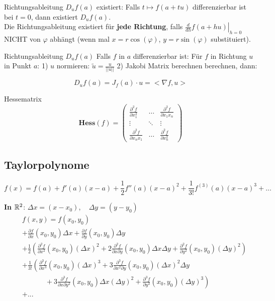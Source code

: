 \begin{Rezept}{Richtungsableitung $D_uf(a)$ existiert:}{} Falls $t \mapsto f(a + tu)$ differenzierbar ist bei $t=0$, dann existiert $D_uf(a)$.\\

	Die Richtungsableitung existiert für \textbf{jede Richtung}, falls $\left.\frac{d}{dh} f(a + hu) \right|_{h=0}$ NICHT von $\varphi$ abhängt (wenn mal $x=r\cos(\varphi)$, $y=r\sin(\varphi)$ substituiert).
\end{Rezept}

\begin{Rezept}{Richtungsableitung $D_u f(a)$}{}
Falls $f$ in $a$ differenzierbar ist: Für $f$ in Richtung $u$ in Punkt $a$: 1) $u$ normieren: $\tilde{u} = \frac{u}{||u||}$ 2) Jakobi Matrix berechnen berechnen, dann:

\[
    D_u f(a) = J_f(a) \cdot u = <\nabla f, u> 
\]
\end{Rezept}

\begin{Definition}{Hessematrix}{}
\[
    \mathbf{Hess}(f) =
        \begin{pmatrix}
            \frac{\partial^2 f}{\partial x_1^2}&\hdots&\frac{\partial^2 f}{\partial x_1 x_n}\\
            \vdots&\ddots&\vdots\\
            \frac{\partial^2 f}{\partial x_n x_1}&\hdots&\frac{\partial^2 f}{\partial x_n^2}
        \end{pmatrix}
\]
\end{Definition}

\subsection{Taylorpolynome}

\[
    f(x) = f(a) + f'(a)(x-a) + \frac{1}{2} f''(a)(x-a)^2 + \frac{1}{3!} f^{(3)}(a)(x-a)^3 + ...
\]

\textbf{In $\mathbb{R}^2$}: $\Delta x = (x - x_0)$, ~ $\Delta y = (y - y_0)$
\begin{align*}
    \; & f(x, y) =f(x_0, y_0)\\ &+ \frac{\partial f}{\partial x}(x_0,y_0) \Delta x + \frac{\partial f}{\partial y}(x_0,y_0) \Delta y\\
    &+ \frac{1}{2} \left(\frac{\partial^2 f}{\partial x^2}(x_0,y_0) (\Delta x)^2 + 2\frac{\partial^2 f}{\partial x \partial y}(x_0,y_0) \Delta x \Delta y + \frac{\partial^2 f}{\partial y^2}(x_0,y_0) (\Delta y)^2\right)\\
    &+ \frac{1}{3!} \left(\frac{\partial^3 f}{\partial x^3}(x_0,y_0) (\Delta x)^3 + 3\frac{\partial^3 f}{\partial x^2 \partial y}(x_0,y_0) (\Delta x)^2 \Delta y\right.\\
    &\quad\quad\quad\;+ \left.3\frac{\partial^3 f}{\partial x \partial y^2}(x_0,y_0) \Delta x (\Delta y)^2 + \frac{\partial^3 f}{\partial y^3}(x_0,y_0) (\Delta y)^3\right)\\
    & + ...
\end{align*}

